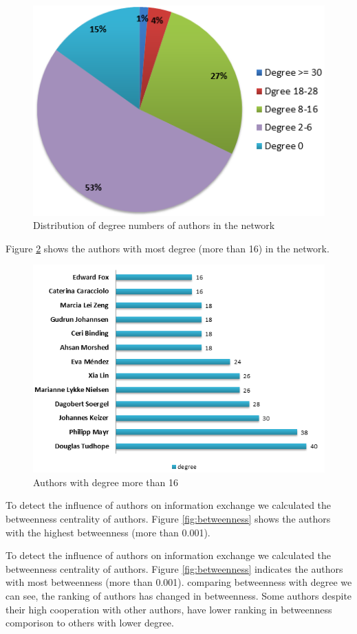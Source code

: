 \documentclass[runningheads,a4paper]{llncs}
\begin{document}
\begin{figure}[H]
	\centering
	\includegraphics[width=0.7\linewidth]{degreePercentage}
	\caption{Distribution of degree numbers of authors in the network} 
	\label{fig:degreePercentage}
\end{figure}

Figure \ref{fig:degree16} shows the authors with most degree (more than 16) in the network. 

\begin{figure}[H]
	\centering
	\includegraphics[width=0.7\linewidth]{degree16}
	\caption{Authors with degree more than 16}
	\label{fig:degree16}
\end{figure}


To detect the influence of authors on information exchange we calculated the betweenness centrality of authors. Figure \ref{fig:betweenness} shows the authors with the highest betweenness (more than 0.001).

To detect the influence of authors on information exchange we calculated the betweenness centrality of authors. Figure \ref{fig:betweenness} indicates the authors with most betweenness (more than 0.001). comparing betweenness with degree we can see, the ranking of authors has changed in betweenness. Some authors despite their high cooperation with other authors, have lower ranking in betweenness comporison to others with lower degree. 
\end{document}
